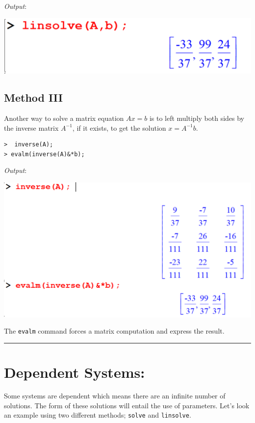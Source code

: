 \documentclass[
]{book}
\theoremstyle{definition}
\theoremstyle{definition}
\theoremstyle{definition}
\theoremstyle{definition}
\theoremstyle{remark}
\begin{document}
\emph{Output}:

\includegraphics{figures/Lessson 5/fig7.png}

\subsection{Method III}\label{method-iii}

Another way to solve a matrix equation \(Ax = b\) is to left multiply both sides by the inverse matrix \(A^{-1}\), if it exists, to get the solution \(x = A^{-1}b\).

\begin{verbatim}
>  inverse(A);
> evalm(inverse(A)&*b);
\end{verbatim}

\emph{Output}:

\includegraphics{figures/Lessson 5/fig8.png}

The \texttt{evalm} command forces a matrix computation and express the result.

\begin{center}\rule{0.5\linewidth}{0.5pt}\end{center}

\section{Dependent Systems:}\label{dependent-systems}

Some systems are dependent which means there are an infinite number of solutions. The form of these solutions will entail the use of parameters.
Let's look an example using two different methods; \texttt{solve} and \texttt{linsolve}.
\end{document}
